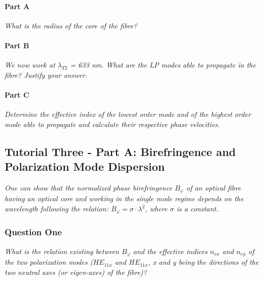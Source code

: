 \documentclass[colorlinks,11pt,a4paper,normalphoto,withhyper,ragged2e]{altareport}
\begin{document}
\paragraph{Part A \linebreak}
\textit{What is the radius of the core of the fibre?} \linebreak




\paragraph{Part B \linebreak}
\textit{We now work at $\lambda_{T2}$ = 633 nm. What are the LP modes able to propagate in the fibre? Justify your answer.} \linebreak




\paragraph{Part C \linebreak}
\textit{Determine the effective index of the lowest order mode and of the highest order mode able to propagate and calculate their respective phase velocities.} \linebreak




\subsection{Tutorial Three - Part A: Birefringence and Polarization Mode Dispersion}
\textit{One can show that the normalized phase birefringence $B_{\varphi}$ of an optical fibre having an optical core and working in the single mode regime depends on the wavelength following the relation:  $B_{\varphi} = \sigma \cdot \lambda^2$, where $\sigma$ is a constant.} \linebreak




\subsubsection{Question One}
\textit{What is the relation existing between $B_{\varphi}$ and the effective indices $n_{ex}$ and $n_{ey}$ of the two polarization modes ($HE_{11x}$  and  $HE_{11x}$, x and y being the directions of the two neutral axes (or eigen-axes) of the fibre)?} \linebreak
\end{document}
